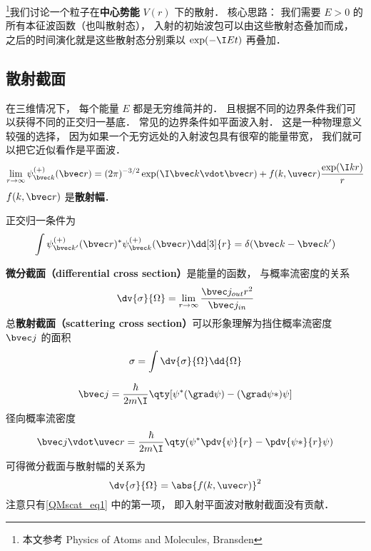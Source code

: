 
\footnote{本文参考 Physics of Atoms and Molecules, Bransden}我们讨论一个粒子在\textbf{中心势能} $V(r)$ 下的散射． 核心思路： 我们需要 $E > 0$ 的所有本征波函数（也叫散射态）， 入射的初始波包可以由这些散射态叠加而成， 之后的时间演化就是这些散射态分别乘以 $\exp(-\I E t)$ 再叠加．

\subsection{散射截面}
在三维情况下， 每个能量 $E$ 都是无穷维简并的． 且根据不同的边界条件我们可以获得不同的正交归一基底． 常见的边界条件如平面波入射． 这是一种物理意义较强的选择， 因为如果一个无穷远处的入射波包具有很窄的能量带宽， 我们就可以把它近似看作是平面波．
\begin{equation}\label{QMscat_eq1}
\lim_{r \to \infty} \psi_{\bvec k}^{(+)}(\bvec r) = (2\pi)^{-3/2} \exp(\I \bvec k \vdot \bvec r) + f(k, \uvec r) \frac{\exp(\I k r)}{r}
\end{equation}
$f(k, \bvec r)$ 是\textbf{散射幅}．

正交归一条件为
\begin{equation}
\int \psi_{\bvec k'}^{(+)}(\bvec r)^* \psi_{\bvec k}^{(+)}(\bvec r) \dd[3]{r} = \delta(\bvec k - \bvec k')
\end{equation}


\textbf{微分截面（differential cross section）}是能量的函数， 与概率流密度的关系
\begin{equation}
\dv{\sigma}{\Omega} = \lim_{r\to\infty}\frac{\bvec j_{out} r^2}{\bvec j_{in}}
\end{equation}
总\textbf{散射截面（scattering cross section）}可以形象理解为挡住概率流密度 $\bvec j$ 的面积
\begin{equation}
\sigma = \int\dv{\sigma}{\Omega} \dd{\Omega}
\end{equation}

\begin{equation}
\bvec j = \frac{\hbar}{2m\I}\qty[\psi^*(\grad \psi) - (\grad \psi*)\psi]
\end{equation}
径向概率流密度
\begin{equation}
\bvec j \vdot \uvec r = \frac{\hbar}{2m\I} \qty(\psi^*\pdv{\psi}{r} - \pdv{\psi*}{r} \psi)
\end{equation}
可得微分截面与散射幅的关系为
\begin{equation}
\dv{\sigma}{\Omega} = \abs{f(k, \uvec r)}^2
\end{equation}
注意只有\autoref{QMscat_eq1} 中的第一项， 即入射平面波对散射截面没有贡献．

